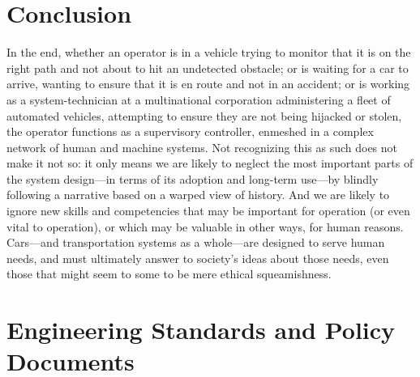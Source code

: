 \section{Conclusion}

In the end, whether an operator is in a vehicle trying to monitor that it
is on the right path and not about to hit an undetected
obstacle; or is waiting
for a car to arrive, wanting to ensure that it is en route
and not in an accident; or is working as a system-technician at a
multinational corporation administering a fleet of automated vehicles,
attempting to ensure they are not being 
hijacked or stolen, the operator functions as a supervisory
controller, enmeshed in a complex network of human and machine
systems. Not recognizing this as such does not make it not so:  it 
only means we are 
likely to neglect the most important parts of the system design---in
terms of its adoption and long-term use---by blindly following a
narrative based on a warped view of history. And we are likely to
ignore new skills and competencies that may be important for
operation (or even vital to operation), or which may be valuable in other ways, for
human reasons. Cars---and transportation systems as a whole---are
designed to serve human needs, and must ultimately answer to society's
ideas about those
needs, even those that might seem to some to be mere ethical squeamishness.







\section{Engineering Standards and Policy Documents}



